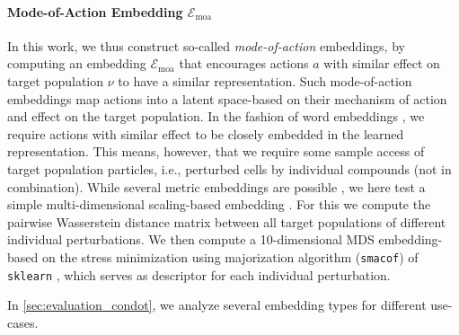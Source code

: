 \paragraph{Mode-of-Action Embedding $\mathcal{E}_\text{moa}$}
In this work, we thus construct so-called \emph{mode-of-action} embeddings, by computing an embedding $\mathcal{E}_\text{moa}$ that encourages actions $a$ with similar effect on target population $\nu$ to have a similar representation.
Such mode-of-action embeddings map actions into a latent space-based on their mechanism of action and effect on the target population.
In the fashion of word embeddings \citep{mikolov2013efficient, mikolov2013distributed, mikolov2013linguistic}, we require actions with similar effect to be closely embedded in the learned representation.
This means, however, that we require some sample access of target population particles, i.e., perturbed cells by individual compounds (not in combination).
While several metric embeddings are possible \citep{chopra2005learning}, we here test a simple multi-dimensional scaling-based embedding \citep{mead1992review}.
For this we compute the pairwise Wasserstein distance matrix between all target populations of different individual perturbations. We then compute a 10-dimensional MDS embedding-based on the stress minimization using majorization algorithm (\texttt{smacof}) \citep{de2009multidimensional} of \texttt{sklearn} \citep{pedregosa2011scikit}, which serves as descriptor for each individual perturbation.

In \cref{sec:evaluation_condot}, we analyze several embedding types for different use-cases.

